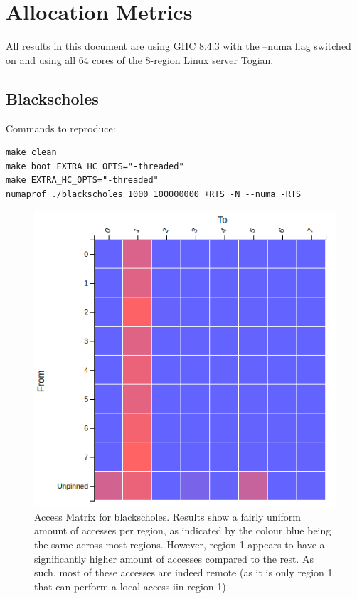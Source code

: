 \documentclass[a4paper,11pt]{article}
\begin{document}
\section{Allocation Metrics}

All results in this document are using GHC 8.4.3 with the --numa flag switched on and using all 64 cores of the 8-region Linux server Togian.

\subsection{Blackscholes}

Commands to reproduce:
\begin{lstlisting}
make clean
make boot EXTRA_HC_OPTS="-threaded"
make EXTRA_HC_OPTS="-threaded"
numaprof ./blackscholes 1000 100000000 +RTS -N --numa -RTS
\end{lstlisting}

\begin{figure}[!htb]
    \centering
    \includegraphics[width=0.5\linewidth]{TechMemo/results/blackscholes/blackscholes_access.png}
    \caption{Access Matrix for blackscholes. Results show  a fairly uniform amount of accesses per region, as indicated by the colour blue being the same across most regions. However, region 1 appears to have a significantly higher amount of accesses compared to the rest. As such, most of these accesses are indeed remote (as it is only region 1 that can perform a local access iin region 1)}
    \label{fig:bscholes_access_matrix}
\end{figure}
\end{document}
